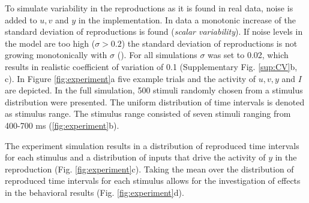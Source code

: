 \documentclass[10pt]{article}
\begin{document}
To simulate variability in the reproductions as it is found in real data, noise is added to $u, v$ and $y$ in the implementation. In data a monotonic increase of the standard deviation of reproductions is found (\textit{scalar variability}). 
If noise levels in the model are too high ($\sigma>0.2$) the standard deviation of reproductions is not growing monotonically with $\sigma$ (\cite{Egger2020}).
For all simulations $\sigma$ was set to 0.02, which results in realistic coefficient of variation of 0.1 (Supplementary Fig. \ref{sup:CV}b, c).
In Figure \ref{fig:experiment}a five example trials and the activity of $u, v, y$ and $I$ are depicted. 
In the full simulation, 500 stimuli randomly chosen from a stimulus distribution were presented. The uniform distribution of time intervals is denoted as stimulus range. 
The stimulus range consisted of seven stimuli ranging from 400-700 ms (\ref{fig:experiment}b).

The experiment simulation results in a distribution of reproduced time intervals for each stimulus and a distribution of inputs that drive the activity of $y$ in the reproduction (Fig. \ref{fig:experiment}c).
Taking the mean over the distribution of reproduced time intervals for each stimulus allows for the investigation of effects in the behavioral results (Fig. \ref{fig:experiment}d). 
\end{document}
